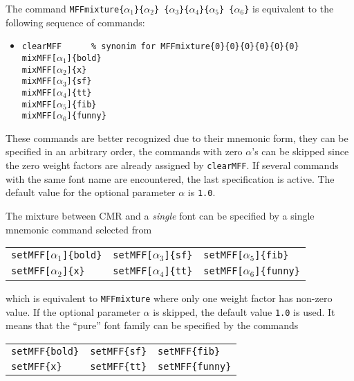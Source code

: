 The command
       {\tt \bs{}MFFmixture\{$\alpha_{1}$\}\{$\alpha_{2}$\}%
            \{$\alpha_{3}$\}\{$\alpha_{4}$\}\{$\alpha_{5}$\}%
            \{$\alpha_{6}$\}}
is equivalent to the following sequence of commands:
\begin{itemize}
\item[]{\tt \bs{}clearMFF\ \ \ \ \ \
  \% synonim for \bs{}MFFmixture\{0\}\{0\}\{0\}\{0\}\{0\}\{0\}}\\
       {\tt \bs{}mixMFF[$\alpha_{1}$]\{bold\}} \\
       {\tt \bs{}mixMFF[$\alpha_{2}$]\{x\}} \\
       {\tt \bs{}mixMFF[$\alpha_{3}$]\{sf\}} \\
       {\tt \bs{}mixMFF[$\alpha_{4}$]\{tt\}} \\
       {\tt \bs{}mixMFF[$\alpha_{5}$]\{fib\}} \\
       {\tt \bs{}mixMFF[$\alpha_{6}$]\{funny\}}
\end{itemize}
These commands are better recognized due to their mnemonic form,
they can be specified in an arbitrary order, the  commands with
zero $\alpha$'s can be skipped since the zero weight factors are
already assigned by {\tt\bs{}clearMFF}.
If several commands with the same font name are encountered,
the last specification is active. The default value for the
optional parameter $\alpha$ is {\tt 1.0}.

The mixture between CMR and a {\em single} font can be
specified by a single mnemonic command selected from
\begin{center}\begin{tabular}{l@{\qquad}l@{\qquad}l}
{\tt \bs{}setMFF[$\alpha_{1}$]\{bold\}} &
{\tt \bs{}setMFF[$\alpha_{3}$]\{sf\}} &
{\tt \bs{}setMFF[$\alpha_{5}$]\{fib\}} \\
{\tt \bs{}setMFF[$\alpha_{2}$]\{x\}} &
{\tt \bs{}setMFF[$\alpha_{4}$]\{tt\}} &
{\tt \bs{}setMFF[$\alpha_{6}$]\{funny\}}
\end{tabular}\end{center}
which is equivalent to {\tt \bs{}MFFmixture} where only
one weight factor has non-zero value. If the optional parameter $\alpha$
is skipped, the default value {\tt 1.0} is used. It means that
the ``pure'' font family can be specified by the commands
\begin{center}\begin{tabular}{l@{\qquad}l@{\qquad}l}
{\tt \bs{}setMFF\{bold\}} &
{\tt \bs{}setMFF\{sf\}} &
{\tt \bs{}setMFF\{fib\}} \\
{\tt \bs{}setMFF\{x\}} &
{\tt \bs{}setMFF\{tt\}} &
{\tt \bs{}setMFF\{funny\}}
\end{tabular}\end{center}

